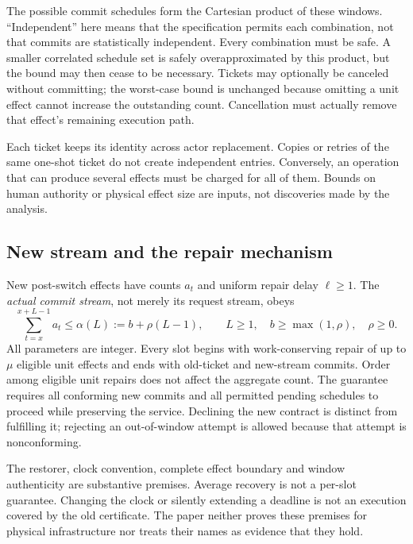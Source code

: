 \documentclass[11pt,a4paper]{article}
\theoremstyle{definition}\newtheorem{definition}{Definition}
\begin{document}
The possible commit schedules form the Cartesian product of these windows. ``Independent'' here means that the specification permits each combination, not that commits are statistically independent. Every combination must be safe. A smaller correlated schedule set is safely overapproximated by this product, but the bound may then cease to be necessary. Tickets may optionally be canceled without committing; the worst-case bound is unchanged because omitting a unit effect cannot increase the outstanding count. Cancellation must actually remove that effect's remaining execution path.

Each ticket keeps its identity across actor replacement. Copies or retries of the same one-shot ticket do not create independent entries. Conversely, an operation that can produce several effects must be charged for all of them. Bounds on human authority or physical effect size are inputs, not discoveries made by the analysis.

\subsection{New stream and the repair mechanism}
New post-switch effects have counts $a_t$ and uniform repair delay $\ell\ge1$. The \emph{actual commit stream}, not merely its request stream, obeys
\begin{equation}
\sum_{t=x}^{x+L-1}a_t\le\alpha(L):=b+\rho(L-1),
\qquad L\ge1,\quad b\ge\max(1,\rho),\quad \rho\ge0.
\label{eq:alpha}
\end{equation}
All parameters are integer. Every slot begins with work-conserving repair of up to $\mu$ eligible unit effects and ends with old-ticket and new-stream commits. Order among eligible unit repairs does not affect the aggregate count. The guarantee requires all conforming new commits and all permitted pending schedules to proceed while preserving the service. Declining the new contract is distinct from fulfilling it; rejecting an out-of-window attempt is allowed because that attempt is nonconforming.

The restorer, clock convention, complete effect boundary and window authenticity are substantive premises. Average recovery is not a per-slot guarantee. Changing the clock or silently extending a deadline is not an execution covered by the old certificate. The paper neither proves these premises for physical infrastructure nor treats their names as evidence that they hold.
\end{document}
